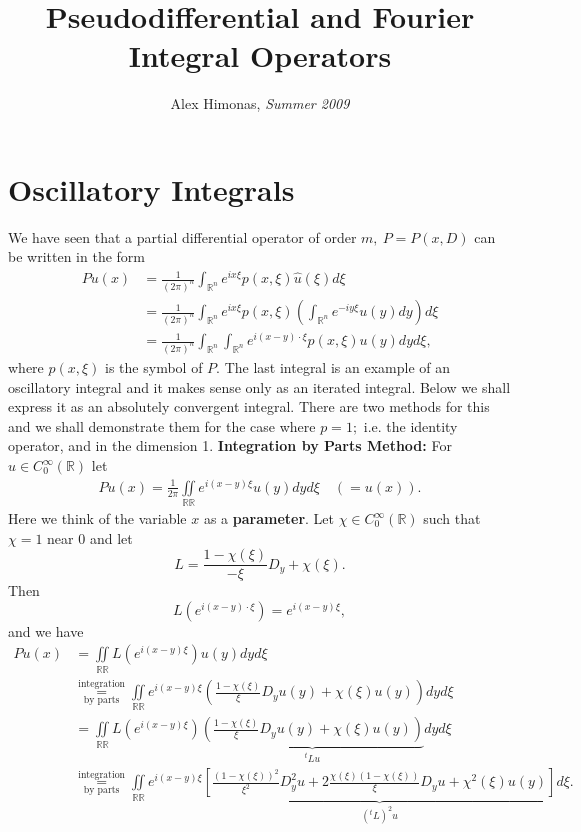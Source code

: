 \documentclass[12pt,reqno]{amsart}
\newcommand{\rr}{\mathbb{R}}
\theoremstyle{plain}  %
\theoremstyle{definition}
\newcommand{\nin}{\noindent}
\begin{document}
\title{Pseudodifferential and Fourier Integral Operators}
\author{Alex Himonas, {\it Summer 2009}}
\maketitle
\setcounter{section}{1}
\section{Oscillatory Integrals}
\nin
We have seen that a partial differential operator of 
order $m,\  P = P(x,D)$  can be
written in the form
\begin{equation}
	\begin{split}
		P u(x)&= \frac{1}{(2\pi)^n}\int_{\rr^n} e^{ix\xi} p(x,\xi)\hat u(\xi) d\xi\\
&= \frac{1}{(2\pi)^n} \int_{\rr^n}e^{ix\xi} p(x,\xi)\left(\int_{\rr^n}e^{-iy\xi}u(y)dy\right) d\xi\\
&=\frac{1}{(2\pi)^n} \int_{\rr^n}
 \int_{\rr^n}e^{i(x-y)\cdot\xi}p(x,\xi)u(y)dy
d\xi, 
\end{split}
\end{equation}
where $p(x,\xi)$ is the symbol of $P$.
The last integral is an example of an oscillatory integral and it makes sense only
as an iterated integral.  Below we shall express it as an absolutely convergent
integral.  There are two methods for
 this and we shall demonstrate them for the case
where $ p = 1; $   i.e.  the identity operator,  and in the dimension 1.
\vskip0.1in
\nin
{\bf Integration by Parts Method:}  For $ u \in C^\infty_0 (\rr) $ let
\begin{equation}
	\begin{split}
		Pu(x) = \frac{1}{2\pi} \iint\limits_{\rr  \rr}
e^{i(x-y)\xi}u(y)dyd\xi\quad (=u(x)).
		\label{2}
	\end{split}
\end{equation}
Here we  think of the variable $ x $ as a {\bf parameter}.
Let $\chi \in C^\infty_0(\rr)$ such that $\chi=1$ near $0$
and let 
$$L=\frac{1-\chi(\xi)}{-\xi}D_y+ \chi(\xi).$$
Then
$$L(e^{i(x-y)\cdot\xi})=e^{i(x-y)\xi},$$
and we have
\begin{equation*}
\begin{split}
Pu(x)
&= \iint\limits_{ \rr  \rr} L(e^{ i(x-y)\xi})u(y)dyd\xi
\\
& \overset{\text{integration}}{\underset{\text{by parts}}{=}} \iint\limits_{\rr  \rr} e^{i(x-y)\xi} \left(\frac{1-\chi(\xi)}{\xi}
D_y u (y)+ \chi(\xi)u(y)\right) dy d\xi \\
&= \iint\limits_{\rr  \rr} L(e^{i(x-y)\xi})\underbrace{
{\left (\frac{1-\chi(\xi)}{\xi} D_y u (y) +  \chi(\xi)u(y) \right )}}_{^t
Lu} dy d\xi\\ 
&
\overset{\text{integration}}{\underset{\text{by parts}}{=}}
\iint\limits_{\rr  \rr} e^{i(x-y)\xi} \underbrace{
\left [\frac{(1-\chi(\xi))^2}{\xi^2}D^2_y u + 2
\frac{\chi(\xi)(1-\chi(\xi))}{\xi} D_y u + \chi^2(\xi) u (y) \right
]}_{(^tL)^2u}
d\xi .
\end{split}
\end{equation*}
\end{document}
